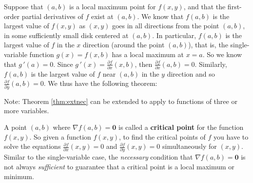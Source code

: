
Suppose that $(a,b)$ is a local maximum point for $f(x,y)$, and that the first-order partial derivatives of $f$
exist at $(a,b)$. We know that $f(a,b)$ is the largest value of $f(x,y)$ as $(x,y)$
goes in all directions from the point $(a,b)$, in some sufficiently small disk centered at $(a,b)$. In
particular, $f(a,b)$ is the largest value of $f$ in the $x$ direction (around the point $(a,b)$), that is, the
single-variable function $g(x) = f(x,b)$ has a local maximum at $x=a$. So we know that $g\,'(a) = 0$. Since
$g\,'(x) = \frac{\partial f}{\partial x}(x,b)$, then $\frac{\partial f}{\partial x}(a,b)=0$. Similarly, $f(a,b)$ is the
largest value of $f$ near $(a,b)$ in the $y$ direction and so $\frac{\partial f}{\partial y}(a,b)=0$. We thus have the
following theorem:

Note: Theorem \ref{thm:extnec} can be extended to apply to functions of three or more variables.

A point $(a,b)$ where $\nabla f (a,b) = \textbf{0}$ is called a \textbf{critical point} for the function $f(x,y)$.
So given a function $f(x,y)$, to find the critical points of $f$ you have to solve the equations
$\frac{\partial f}{\partial x}(x,y) = 0$ and $\frac{\partial f}{\partial y}(x,y) = 0$ simultaneously for $(x,y)$.
Similar to the single-variable case, the \emph{necessary} condition that $\nabla f (a,b) = \textbf{0}$ is not always
\emph{sufficient} to guarantee that a critical point is a local maximum or minimum.

